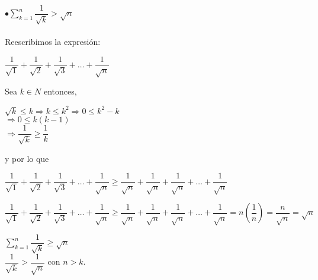 \documentclass[12pt,a4paper,scrartcl]{article}
\begin{document}
{%
$\bullet\displaystyle
\sum_{k=1}^{n}\dfrac{1}{\sqrt{k}}> \sqrt{n}$\\
\\
Reescribimos la expresi\'on:
\begin{center}
$\dfrac{1}{\sqrt{1}} + \dfrac{1}{\sqrt{2}}+\dfrac{1}{\sqrt{3}}+\ldots+\dfrac{1}{\sqrt{n}}$
\end{center}
Sea $k\in N$ entonces,\\
\begin{center}
$\sqrt{k} \leq k \Rightarrow k\leq k^2 \Rightarrow 0\leq k^2-k$ \\
$\Rightarrow 0 \leq k(k-1)$
\\$\Rightarrow \dfrac{1}{\sqrt{k}} \geq \dfrac{1}{k}$
\end{center}
y por lo que \\

\begin{center}
$\dfrac{1}{\sqrt{1}} + \dfrac{1}{\sqrt{2}}+\dfrac{1}{\sqrt{3}}+\ldots+\dfrac{1}{\sqrt{n}} \geq \dfrac{1}{\sqrt{n}} + \dfrac{1}{\sqrt{n}}+\dfrac{1}{\sqrt{n}}+\ldots+\dfrac{1}{\sqrt{n}}$
\end{center}

\begin{center}
$\dfrac{1}{\sqrt{1}} + \dfrac{1}{\sqrt{2}}+\dfrac{1}{\sqrt{3}}+\ldots+\dfrac{1}{\sqrt{n}} \geq \dfrac{1}{\sqrt{n}} + \dfrac{1}{\sqrt{n}}+\dfrac{1}{\sqrt{n}}+\ldots+\dfrac{1}{\sqrt{n}}= n(\dfrac{1}{n})=\dfrac{n}{\sqrt{n}}=\sqrt{n}$
\end{center}

\begin{center}
$\displaystyle
\sum_{k=1}^{n}\dfrac{1}{\sqrt{k}} \geq \sqrt{n}$  \\ $\dfrac{1}{\sqrt{k}}>\dfrac{1}{\sqrt{n}}$ con $n>k$.
\end{center}




}
\end{document}
